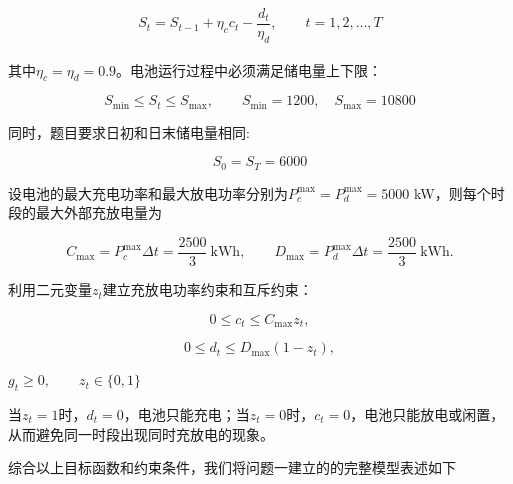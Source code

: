 \documentclass[UTF8]{ctexart}
\let\oldcite\cite
\renewcommand{\cite}[1]{\textsuperscript{\oldcite{#1}}}
\begin{document}
    \begin{equation}
        S_t=S_{t-1}+\eta_cc_t-\frac{d_t}{\eta_d},
        \qquad t=1,2,\ldots,T    
    \end{equation}
    
    其中$\eta_c=\eta_d=0.9$。电池运行过程中必须满足储电量上下限\cite{7779156}：
    
    \begin{equation}
        S_{\min}\leq S_t\leq S_{\max},
        \qquad S_{\min}=1200,\quad S_{\max}=10800
    \end{equation}
    
    同时，题目要求日初和日末储电量相同:
    
    \begin{equation}
        S_0=S_T=6000
    \end{equation}\par
    
    设电池的最大充电功率和最大放电功率分别为$P_c^{\max}=P_d^{\max}=5000$ kW，则每个时段的最大外部充放电量为
    
    \begin{equation}
        C_{\max}=P_c^{\max}\Delta t=\frac{2500}{3}\ \mathrm{kWh},\qquad
        D_{\max}=P_d^{\max}\Delta t=\frac{2500}{3}\ \mathrm{kWh}.
    \end{equation}
    
    利用二元变量$z_t$建立充放电功率约束和互斥约束：
    
    \begin{equation}
        0\leq c_t\leq C_{\max}z_t,
    \end{equation}
    
    \begin{equation}
        0\leq d_t\leq D_{\max}(1-z_t),
    \end{equation}
    
    \begin{center}
        \(g_t\geq0,\qquad z_t\in\{0,1\}\) 
    \end{center}
    
    当$z_t=1$时，$d_t=0$，电池只能充电；当$z_t=0$时，$c_t=0$，电池只能放电或闲置，从而避免同一时段出现同时充放电的现象。\par
    
    
    综合以上目标函数和约束条件，我们将问题一建立的的完整模型表述如下
    
\end{document}
